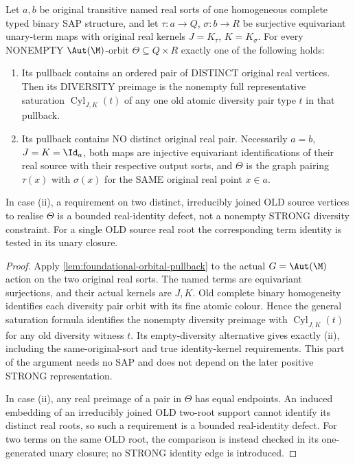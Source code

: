 \begin{lemma}
\label{lem:typed-term-orbit-diagonal-dichotomy}
Let \(a,b\) be original
transitive named real sorts
of one homogeneous complete
typed binary SAP structure,
and let
\(\tau:a\to Q\),
\(\sigma:b\to R\)
be surjective equivariant
unary-term maps with
original real kernels
\(J=K_\tau\), \(K=K_\sigma\).
For every NONEMPTY
\(\Aut(\M)\)-orbit
\(\Theta\subseteq Q\times R\)
exactly one of the following
holds:
\begin{enumerate}[label=(\roman*)]
\item Its pullback contains
an ordered pair of
DISTINCT original real
vertices. Then its
DIVERSITY preimage is
the nonempty full
representative saturation
\(\operatorname{Cyl}_{J,K}(t)\)
of any one old atomic
diversity pair type
\(t\) in that pullback.
\item Its pullback contains
NO distinct original
real pair. Necessarily
\(a=b\), \(J=K=\Id_a\),
both maps are injective
equivariant identifications
of their real source with
their respective output
sorts, and \(\Theta\)
is the graph pairing
\(\tau(x)\) with
\(\sigma(x)\) for the
SAME original real point
\(x\in a\).
\end{enumerate}
In case (ii), a requirement
on two distinct, irreducibly
joined OLD source vertices
to realise \(\Theta\)
is a bounded real-identity
defect, not a nonempty
STRONG diversity constraint.
For a single OLD source
real root the corresponding
term identity is tested
in its unary closure.
\end{lemma}
\begin{proof}
Apply \cref{lem:foundational-orbital-pullback} to the actual
$G=\Aut(\M)$ action on the two original real sorts. The named terms
are equivariant surjections, and their actual kernels are $J,K$.
Old complete binary homogeneity identifies each diversity pair orbit
with its fine atomic colour. Hence the general saturation formula
identifies the nonempty diversity preimage with
$\operatorname{Cyl}_{J,K}(t)$ for any old diversity witness $t$.
Its empty-diversity alternative gives exactly (ii), including the
same-original-sort and true identity-kernel requirements. This part
of the argument needs no SAP and does not depend on the later
positive STRONG representation.

In case (ii), any real preimage of a pair in $\Theta$ has equal
endpoints. An induced embedding of an irreducibly joined OLD two-root
support cannot identify its distinct real roots, so such a requirement
is a bounded real-identity defect. For two terms on the same OLD root,
the comparison is instead checked in its one-generated unary closure;
no STRONG identity edge is introduced.
\end{proof}

